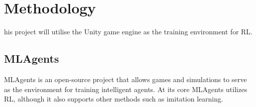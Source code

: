 
%
\let\textcircled=\pgftextcircled
\chapter{Methodology}


his project will utilise the Unity game engine as the training environment for RL\@.


\section{MLAgents}
MLAgents is an open-source project that allows games and simulations to serve as the environment for training intelligent agents. At its core MLAgents utilizes RL, although it also supports other methods such as imitation learning.

